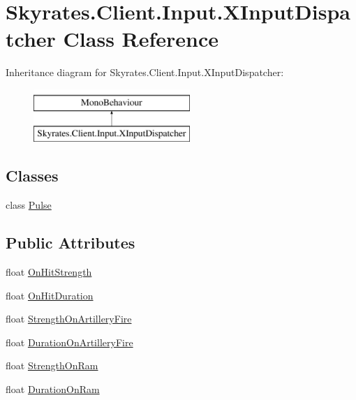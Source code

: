 \hypertarget{class_skyrates_1_1_client_1_1_input_1_1_x_input_dispatcher}{\section{Skyrates.\-Client.\-Input.\-X\-Input\-Dispatcher Class Reference}
\label{class_skyrates_1_1_client_1_1_input_1_1_x_input_dispatcher}
}


 


Inheritance diagram for Skyrates.\-Client.\-Input.\-X\-Input\-Dispatcher\-:\begin{figure}[H]
\begin{center}
\leavevmode
\includegraphics[height=2.000000cm]{class_skyrates_1_1_client_1_1_input_1_1_x_input_dispatcher}
\end{center}
\end{figure}
\subsection*{Classes}
\begin{DoxyCompactItemize}
\item 
class \hyperlink{class_skyrates_1_1_client_1_1_input_1_1_x_input_dispatcher_1_1_pulse}{Pulse}
\end{DoxyCompactItemize}
\subsection*{Public Attributes}
\begin{DoxyCompactItemize}
\item 
float \hyperlink{class_skyrates_1_1_client_1_1_input_1_1_x_input_dispatcher_a5f7cd1e18bea1cbd99c5df7dd27d4804}{On\-Hit\-Strength}
\item 
float \hyperlink{class_skyrates_1_1_client_1_1_input_1_1_x_input_dispatcher_aebb6a36b42b636002a2ea32d6096ec31}{On\-Hit\-Duration}
\item 
float \hyperlink{class_skyrates_1_1_client_1_1_input_1_1_x_input_dispatcher_af0d461624b8a89d22a04c2221cd1415c}{Strength\-On\-Artillery\-Fire}
\item 
float \hyperlink{class_skyrates_1_1_client_1_1_input_1_1_x_input_dispatcher_adc34babd8156ce85b1a40e7546ddd2ba}{Duration\-On\-Artillery\-Fire}
\item 
float \hyperlink{class_skyrates_1_1_client_1_1_input_1_1_x_input_dispatcher_ab6486f41a0043a925a0ca981d82c9594}{Strength\-On\-Ram}
\item 
float \hyperlink{class_skyrates_1_1_client_1_1_input_1_1_x_input_dispatcher_aef067d0a91e6138d47cb20d83859ceb0}{Duration\-On\-Ram}
\end{DoxyCompactItemize}


